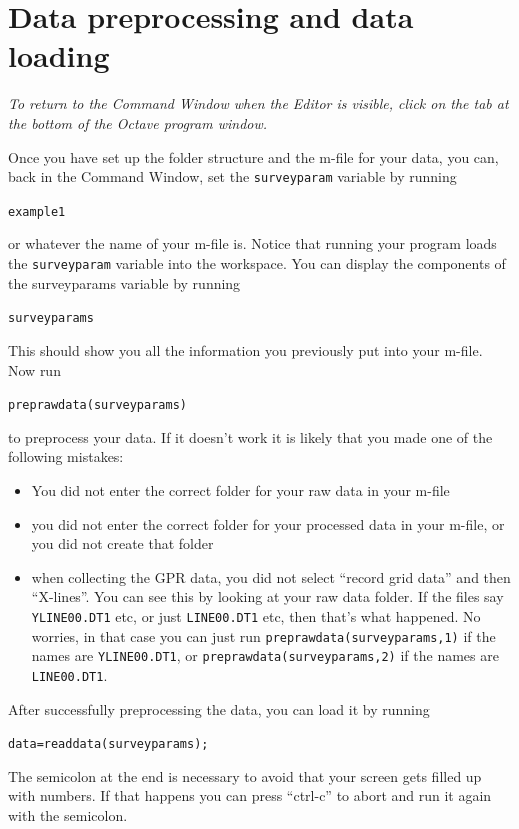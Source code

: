 \documentclass[11pt]{article}
\begin{document}
\section{Data preprocessing and data loading}
\emph{To return to the Command Window when the Editor is visible,
  click on the tab at the bottom of the Octave program window.}

Once you have set up the folder structure and the m-file for your
data, you can, back in the Command Window, set the \verb#surveyparam#
variable by running

\qquad \verb#example1#

or whatever the name of your m-file is. Notice that running your program
loads the \verb#surveyparam# variable into the workspace. You can display the
components of the surveyparams variable by running

\qquad \verb#surveyparams#

This should show you all the information you previously put into your
m-file.  Now run

\qquad \verb#preprawdata(surveyparams)#

to preprocess your data. If it doesn't work it is likely that you made
one of the following mistakes:
\begin{itemize}
\item You did not enter the correct folder for your raw data in your
  m-file
\item you did not enter the correct folder for your processed data in
  your m-file, or you did not create that folder
\item when collecting the GPR data, you did not select ``record grid
  data'' and then ``X-lines''. You can see this by looking at your raw
  data folder. If the files say \verb#YLINE00.DT1# etc, or just
  \verb#LINE00.DT1# etc, then that's what happened. No worries, in that
  case you can just run \qquad \verb#preprawdata(surveyparams,1)# if
  the names are \verb#YLINE00.DT1#, or \verb#preprawdata(surveyparams,2)#
  if the names are \verb#LINE00.DT1#.
\end{itemize}

After successfully preprocessing the data, you can load it by running

\qquad \verb#data=readdata(surveyparams);#

The semicolon at the end is necessary to avoid that your screen gets
filled up with numbers. If that happens you can press ``ctrl-c'' to
abort and run it again with the semicolon.
 
\end{document}
